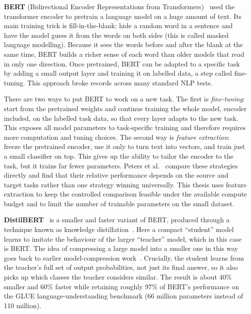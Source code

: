 \textbf{BERT} (Bidirectional Encoder Representations from Transformers)~\cite{devlin2019bert} used the transformer encoder to pretrain a language model on a huge amount of text. Its main training trick is fill-in-the-blank: hide a random word in a sentence and have the model guess it from the words on both sides (this is called masked language modelling). Because it sees the words before and after the blank at the same time, BERT builds a richer sense of each word than older models that read in only one direction. Once pretrained, BERT can be adapted to a specific task by adding a small output layer and training it on labelled data, a step called fine-tuning. This approach broke records across many standard NLP tests.

There are two ways to put BERT to work on a new task. The first is \emph{fine-tuning}: start from the pretrained weights and continue training the whole model, encoder included, on the labelled task data, so that every layer adapts to the new task. This exposes all model parameters to task-specific training and therefore requires more computation and tuning choices. The second way is \emph{feature extraction}: freeze the pretrained encoder, use it only to turn text into vectors, and train just a small classifier on top. This gives up the ability to tailor the encoder to the task, but it trains far fewer parameters. Peters et al.~\cite{peters2019tune} compare these strategies directly and find that their relative performance depends on the source and target tasks rather than one strategy winning universally. This thesis uses feature extraction to keep the controlled comparison feasible under the available compute budget and to limit the number of trainable parameters on the small dataset.

\textbf{DistilBERT}~\cite{sanh2019distilbert} is a smaller and faster variant of BERT, produced through a technique known as knowledge distillation~\cite{hinton2015distilling}. Here a compact ``student'' model learns to imitate the behaviour of the larger ``teacher'' model, which in this case is BERT. The idea of compressing a large model into a smaller one in this way goes back to earlier model-compression work~\cite{bucila2006model}. Crucially, the student learns from the teacher's full set of output probabilities, not just its final answer, so it also picks up which classes the teacher considers similar. The result is about 40\% smaller and 60\% faster while retaining roughly 97\% of BERT's performance on the GLUE language-understanding benchmark (66 million parameters instead of 110 million).

